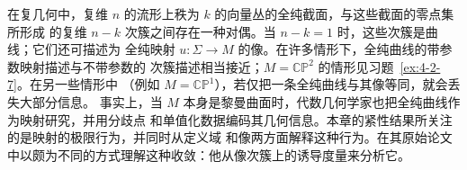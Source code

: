 \begin{remark}\label{rem:5-2-3}
在复几何中，复维 $n$ 的流形上秩为 $k$ 的向量丛的全纯截面，与这些截面的零点集所形成
的复维 $n-k$ 次簇之间存在一种对偶。当 $n-k=1$ 时，这些次簇是曲线；它们还可描述为
全纯映射 $u:\Sigma\to M$ 的像。在许多情形下，全纯曲线的带参数映射描述与不带参数的
次簇描述相当接近；$M=\mathbb{CP}^2$ 的情形见习题~\ref{ex:4-2-7}。在另一些情形中
（例如 $M=\mathbb{CP}^1$），若仅把一条全纯曲线与其像等同，就会丢失大部分信息。
事实上，当 $M$ 本身是黎曼曲面时，代数几何学家也把全纯曲线作为映射研究，并用分歧点
和单值化数据编码其几何信息。本章的紧性结果所关注的是映射的极限行为，并同时从定义域
和像两方面解释这种行为。在其原始论文
 中以颇为不同的方式理解这种收敛：他从像次簇上的诱导度量来分析它。
\end{remark}
